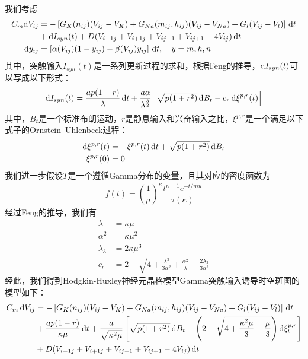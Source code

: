 \documentclass[
bachelor,
nofont, %
pdflinks,
]{xjtuthesis}
\begin{document}
我们考虑
\begin{align}
\notag C_m \mathrm d V_{ij} &= -\left[G_{K} (n_{ij})(V_{ij} - V_{K}) + G_{Na}(m_{ij},h_{ij})(V_{ij}-V_{Na}) + G_{l} (V_{ij}- V_{l}) \right] \,\mathrm d t\\
&+ \mathrm d I_{syn}(t) +D(V_{i-1j}+V_{i+1j}+V_{ij-1}+V_{ij+1}-4V_{ij}) \,\mathrm d t\\
\mathrm d y_{ij} &= \left[\alpha (V_{ij})(1-y_{ij})-\beta (V_{ij})y_{ij}\right] \,\mathrm d t, \quad y=m,h,n
\end{align}
其中，突触输入$I_{syn}(t)$是一系列更新过程的求和，根据Feng\cite{feng2006dynamics}的推导，$\mathrm d I_{syn}(t)$可以写成以下形式：
\begin{align}
\mathrm d I_{syn}(t) = \frac{ap(1-r)}{\lambda} \,\mathrm d t + \frac{a \alpha}{\lambda^{\frac{3}{2}}} \left[\sqrt{p(1+r^2)} \,\mathrm d B_t - c_r \,\mathrm d \xi^{p,r}(t) \right]
\end{align}
其中，$B_t$是一个标准布朗运动，$r$是静息输入和兴奋输入之比，$\xi^{p,r}$是一个满足以下式子的Ornstein–Uhlenbeck过程：
\begin{align}
\mathrm d \xi^{p,r}(t) &= - \xi^{p,r}(t) \,\mathrm d t + \sqrt{p(1+r^2)} \,\mathrm d B_t \\
\notag \xi^{p,r}(0) & =0
\end{align}
我们进一步假设$T$是一个遵循Gamma分布的变量，且其对应的密度函数为
\begin{align}
f(t)=\left(\dfrac{1}{\mu}\right)^{\kappa} \dfrac{t^{\kappa-1}e^{-t/mu}}{\tau(\kappa)}
\end{align}
经过Feng\cite{feng2006dynamics}的推导，我们有
\begin{align}
\lambda &= \kappa \mu \\
\alpha ^2 &= \kappa \mu^2 \\
\lambda _3 &= 2 \kappa \mu^3 \\
c_r &= 2 - \sqrt{4+\frac{\lambda^3}{3\alpha^2}+\frac{\alpha^2}{\lambda}-\frac{2\lambda_3}{3\alpha^2}}
\end{align}
经此，我们得到Hodgkin-Huxley神经元晶格模型Gamma突触输入诱导时空斑图的模型如下：
\begin{align}
\notag C_m \ud V_{ij} &= -\left[\gk (n_{ij})(V_{ij} - \vk) + \gna(m_{ij},h_{ij})(V_{ij}-\vna) + \gl (V_{ij}- \vl) \right] \ud t \\
\notag & + \dfrac{ap(1-r)}{\kappa \mu} \ud t
+ \dfrac{a}{\sqrt{\kappa^2 \mu}} \left[ \sqrt{p(1+r^2)} \ud B_t -  \left(2-\sqrt{4+ \dfrac{\kappa^2 \mu}{3}-\dfrac{\mu}{3}} \right) 
\d \xi ^{p, r} _t \right]\\
& %
+ D(V_{i-1j}+V_{i+1j}+V_{ij-1}+V_{ij+1}-4V_{ij}) \ud t
\end{align}
\end{document}
